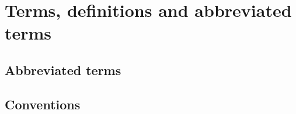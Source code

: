 \chapter{Terms, definitions and abbreviated terms}

\section{Abbreviated terms}

\section{Conventions}
